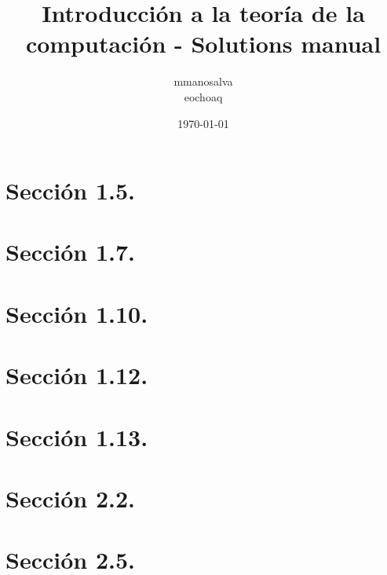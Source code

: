 \documentclass[12pt,a4paper]{report}
\title{Introducción a la teoría de la computación - Solutions manual}
\author{mmanosalva\\eochoaq}
\date{\today}
\begin{document}
\maketitle
\tableofcontents
\cleardoublepage

\chapter{Sección 1.5.}

\chapter{Sección 1.7.}

\chapter{Sección 1.10.}

\chapter{Sección 1.12.}

\chapter{Sección 1.13.}

\chapter{Sección 2.2.}

\chapter{Sección 2.5.}

\end{document}
